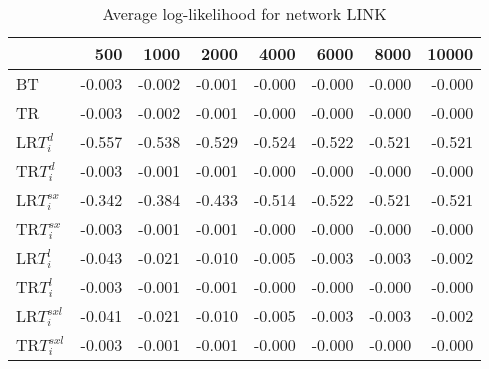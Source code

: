 \begin{table}
 \begin{center}
 \begin{tabular}{lrrrrrrr}
 & 500 & 1000 & 2000 & 4000 & 6000 & 8000 & 10000\\\hline
BT & -0.003 & -0.002 & -0.001 & -0.000 & -0.000 & -0.000 & -0.000\\\hline
TR & -0.003 & -0.002 & -0.001 & -0.000 & -0.000 & -0.000 & -0.000\\\hline
LR$T_i^d$ & -0.557 & -0.538 & -0.529 & -0.524 & -0.522 & -0.521 & -0.521\\\hline
TR$T_i^d$ & -0.003 & -0.001 & -0.001 & -0.000 & -0.000 & -0.000 & -0.000\\\hline
LR$T_i^{sx}$ & -0.342 & -0.384 & -0.433 & -0.514 & -0.522 & -0.521 & -0.521\\\hline
TR$T_i^{sx}$ & -0.003 & -0.001 & -0.001 & -0.000 & -0.000 & -0.000 & -0.000\\\hline
LR$T_i^l$ & -0.043 & -0.021 & -0.010 & -0.005 & -0.003 & -0.003 & -0.002\\\hline
TR$T_i^l$ & -0.003 & -0.001 & -0.001 & -0.000 & -0.000 & -0.000 & -0.000\\\hline
LR$T_i^{sxl}$ & -0.041 & -0.021 & -0.010 & -0.005 & -0.003 & -0.003 & -0.002\\\hline
TR$T_i^{sxl}$ & -0.003 & -0.001 & -0.001 & -0.000 & -0.000 & -0.000 & -0.000\\\hline
\end{tabular}
\end{center}
\caption{Average log-likelihood for network LINK }
\label{Linkll}
\end{table}



